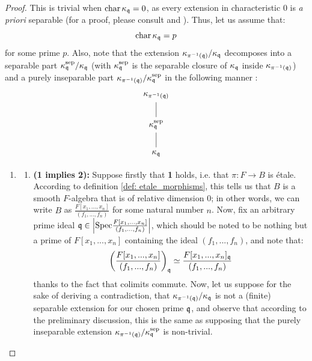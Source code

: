             \begin{proof}
                This is trivial when $\operatorname{char} \kappa_{\mathfrak{q}} = 0$, as every extension in characteristic $0$ is \textit{a priori} separable (for a proof, please consult \cite[\href{https://stacks.math.columbia.edu/tag/030Q}{Tag 030Q}]{stacks} and \cite[\href{https://stacks.math.columbia.edu/tag/030N}{Tag 030N}]{stacks}). Thus, let us assume that:
                    $$\operatorname{char} \kappa_{\mathfrak{q}} = p$$
                for some prime $p$. Also, note that the extension $\kappa_{\pi^{-1}(\mathfrak{q})}/\kappa_{\mathfrak{q}}$ decomposes into a separable part $\kappa_{\mathfrak{q}}^{\mathrm{sep}}/\kappa_{\mathfrak{q}}$ (with $\kappa_{\mathfrak{q}}^{\mathrm{sep}}$ is the separable closure of $\kappa_{\mathfrak{q}}$ inside $\kappa_{\pi^{-1}(\mathfrak{q})}$) and a purely inseparable part $\kappa_{\pi^{-1}(\mathfrak{q})}/\kappa_{\mathfrak{q}}^{\mathrm{sep}}$ in the following manner \cite[\href{https://stacks.math.columbia.edu/tag/030K}{Tag 030K}]{stacks}:
                    $$
                        \begin{tikzcd}
                        	{\kappa_{\pi^{-1}(\q)}} \\
                        	{\kappa_{\q}^{\sep}} \\
                        	{\kappa_{\q}}
                        	\arrow[no head, from=3-1, to=2-1]
                        	\arrow[no head, from=2-1, to=1-1]
                        \end{tikzcd}
                    $$
                \begin{enumerate}
                    \item 
                        \begin{enumerate}
                            \item \textbf{(1 implies 2):} Suppose firstly that \textbf{1} holds, i.e. that $\pi: F \to B$ is \'etale. According to definition \ref{def: etale_morphisms}, this tells us that $B$ is a smooth $F$-algebra that is of relative dimension $0$; in other words, we can write $B$ as $\frac{F[x_1, ..., x_n]}{(f_1, ..., f_n)}$ for some natural number $n$. Now, fix an arbitrary prime ideal $\mathfrak{q} \in \left|\mathrm{Spec} \frac{F[x_1, ..., x_n]}{(f_1, ..., f_n)}\right|$, which should be noted to be nothing but a prime of $F[x_1, ..., x_n]$ containing the ideal $(f_1, ..., f_n)$, and note that:
                                $$\left(\frac{F[x_1, ..., x_n]}{(f_1, ..., f_n)}\right)_{\mathfrak{q}} \simeq \frac{F[x_1, ..., x_n]_{\mathfrak{q}}}{(f_1, ..., f_n)}$$
                            thanks to the fact that colimits commute. Now, let us suppose for the sake of deriving a contradiction, that $\kappa_{\pi^{-1}(\mathfrak{q})}/\kappa_{\mathfrak{q}}$ is not a (finite) separable extension for our chosen prime $\mathfrak{q}$, and observe that according to the preliminary discussion, this is the same as supposing that the purely inseparable extension $\kappa_{\pi^{-1}(\mathfrak{q})}/\kappa_{\mathfrak{q}}^{\mathrm{sep}}$ is non-trivial. 

\end{enumerate}
\end{enumerate}
\end{proof}
